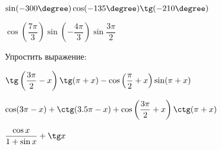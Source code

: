 \begin{class}[number=5]
\begin{listofex}
\begin{enumcols}[itemcolumns=2]
			\item \( \sin(-300\degree)\cos(-135\degree)\tg(-210\degree) \)
			\item \( \cos\left( \dfrac{7\pi}{3} \right)\sin\left( -\dfrac{4\pi}{3} \right)\sin\dfrac{3\pi}{2} \)
		\end{enumcols}
		\item Упростить выражение:
		\begin{enumcols}[itemcolumns=1]
			\item \( \tg\left( \dfrac{3\pi}{2}-x \right)\tg(\pi+x)-\cos\left( \dfrac{\pi}{2}+x \right)\sin(\pi+x) \)
			\item \( \cos(3\pi-x)+\ctg(3.5\pi-x)+\cos\left( \dfrac{3\pi}{2}+x \right)\ctg(\pi+x) \)
			\item \( \dfrac{\cos x}{1+\sin x}+\tg x \)
		\end{enumcols}
		\item {}
		\item {}
	\end{listofex}
\end{class}
%
%
